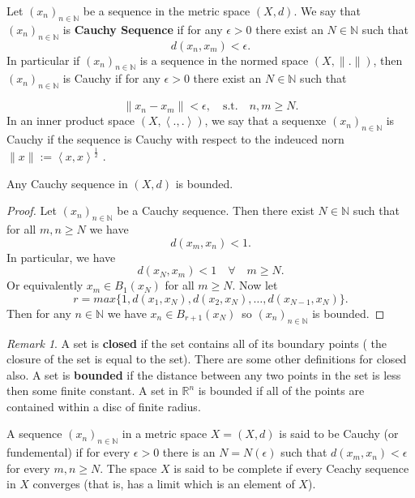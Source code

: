 \documentclass{article}
\theoremstyle{remark}
\newtheorem*{remark}{Remark}
\begin{document}
\begin{definition}
  
  Let $(x_n)_{n \in \mathbb{N}}$ be a sequence in the metric space $(X, d)$. We say that $\left( x_n \right)_{n \in \mathbb{N}} $ is \textbf{Cauchy Sequence} if for any $ \epsilon > 0$ there exist an $N \in \mathbb{N}$ such that \[  
    d(x_{n}, x_{m}) < \epsilon      
  .\]  
  In particular if $\left( x_n \right)_{n \in \mathbb{N}}$ is a sequence in the normed space $\left( X,\|.\| \right) $, then $\left( x_n \right) _{n \in\mathbb{N}}$ is Cauchy if for any $\epsilon > 0$ there exist an $N \in \mathbb{N}$ such that

  \[
  \|x_{n}  - x_{m}\| < \epsilon,\quad \textrm{s.t.} \quad  n,m \ge N
  .\] 
  In an inner product space $(X, \left< .,. \right> )$, we say that a sequenxe $\left( x_n \right)_{n \in \mathbb{N}}$ is Cauchy if the sequence is Cauchy with respect to the indeuced norn $\|x\| := \left< x,x \right>^{ \frac{1}{2} }$ . 
\end{definition}

\begin{lemma}
  Any Cauchy sequence in $\left( X,d \right)$ is bounded.
\end{lemma}

\begin{proof}
  Let $\left( x_n \right) _{n \in \mathbb{N}}$ be a Cauchy sequence. Then there exist $N \in \mathbb{N}$ such that for all $ m,n \ge N$ we have \[
    d(x_{m}, x_{n}) < 1
  .\] In particular, we have \[
  d(x_{N},x_{m})  < 1 \quad \forall \quad m \ge N      
  .\] 
  Or equivalently $x_{m} \in B_1(x_N)$ for all $m \ge N$. Now let \[
    r = max \{ 1, d(x_1, x_N), d(x_2, x_N), \ldots, d(x_{N-1}, x_N)\} 
  .\] 
  Then for any $n \in \mathbb{N}$ we have $x_n \in B_{r+1}\left( x_N \right) $\, so $\left( x_n \right) _{n \in \mathbb{N}}$
is bounded. 

\end{proof}

\begin{remark}
A set is  \textbf{closed} if the set contains all of its boundary points ( the closure of the set is equal to the set). There are some other definitions for closed also.  A set is \textbf{bounded} if the distance between any two points in the set is less then some finite constant. A set in $\mathbb{R}^{n}$ is bounded if all of the points are contained within a disc of finite radius.
\end{remark}


\begin{definition}[Completeness]
  A sequence $\left( x_{n} \right)_{n \in \mathbb{N}}$ in a metric space $X=\left( X,d \right)$ is said to be Cauchy (or fundemental) if for every $\epsilon> 0$ there is an $N = N\left( \epsilon \right)$ such that $d\left( x_{m}, x_{n} \right) < \epsilon$  for every $m,n \ge N$. The space $X$ is said to be complete if every Ceachy sequence in $X$ converges (that is, has a limit which is an element of $X$). 
\end{definition}
\end{document}
